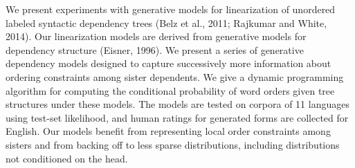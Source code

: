 We present experiments with generative models for linearization of unordered labeled syntactic dependency trees (Belz et al., 2011; Rajkumar and White, 2014). Our linearization models are derived from generative models for dependency structure (Eisner, 1996). We present a series of generative dependency models designed to capture successively more information about ordering constraints among sister dependents. We give a dynamic programming algorithm for computing the conditional probability of word orders given tree structures under these models. The models are tested on corpora of 11 languages using test-set likelihood, and human ratings for generated forms are collected for English. Our models benefit from representing local order constraints among sisters and from backing off to less sparse distributions, including distributions not conditioned on the head.

